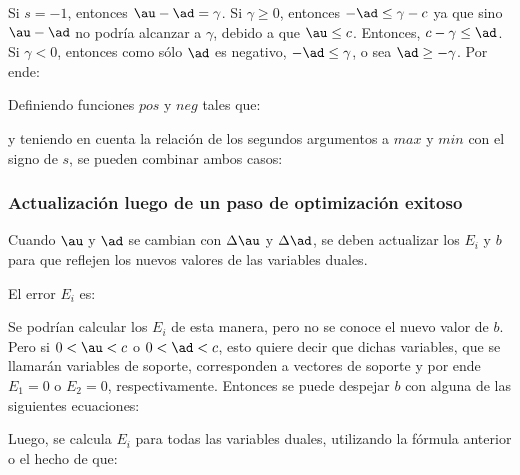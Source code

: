 Si $s=-1$, entonces $\au- \ad = \gamma$. Si $\gamma \geq 0$, entonces $-\ad \leq  \gamma-c$ ya que sino $\au - \ad$ no podría alcanzar a $\gamma$, debido a que $\au \leq c$. Entonces, $c-\gamma \leq \ad$. Si $\gamma <0$, entonces como sólo $\ad$ es negativo, $-\ad \leq \gamma$, o sea $\ad \geq -\gamma$. Por ende:


Definiendo funciones $pos$ y $neg$ tales que:


y teniendo en cuenta la relación de los segundos argumentos a $max$ y $min$ con el signo de $s$, se pueden combinar ambos casos: 



\subsubsection{Actualización luego de un paso de optimización exitoso}

Cuando $\au$ y $\ad$ se cambian con $\Delta \au$ y $\Delta \ad$, se deben actualizar los $E_i$ y $b$ para que reflejen los nuevos valores de las variables duales.

El error $E_i$ es:


Se podrían calcular los $E_i$ de esta manera, pero no se conoce el nuevo valor de $b$. Pero si $0 < \au < c$ o $0 < \ad < c$, esto quiere decir que dichas variables, que se llamarán variables de soporte, corresponden a vectores de soporte y por ende $E_1=0$ o $E_2=0$, respectivamente. Entonces se puede despejar $b$ con alguna de las siguientes ecuaciones:


Luego, se calcula $E_i$ para todas las variables duales, utilizando la fórmula anterior o el hecho de que:


